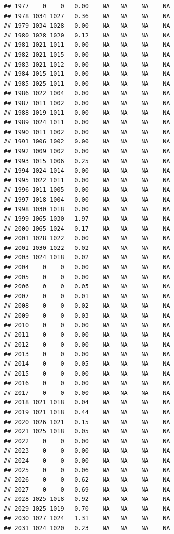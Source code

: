 \documentclass{article}\usepackage{graphicx, color}
\makeatletter
\newenvironment{kframe}{%
 \def\at@end@of@kframe{}%
 \ifinner\ifhmode%
  \def\at@end@of@kframe{\end{minipage}}%
  \begin{minipage}{\columnwidth}%
 \fi\fi%
 \def\FrameCommand##1{\hskip\@totalleftmargin \hskip-\fboxsep
 \colorbox{shadecolor}{##1}\hskip-\fboxsep
     \hskip-\linewidth \hskip-\@totalleftmargin \hskip\columnwidth}%
 \MakeFramed {\advance\hsize-\width
   \@totalleftmargin\z@ \linewidth\hsize
   \@setminipage}}%
 {\par\unskip\endMakeFramed%
 \at@end@of@kframe}
\newenvironment{knitrout}{}{} %
\makeatother
\begin{document}
\begin{knitrout}
\begin{kframe}
\begin{verbatim}
## 1977    0    0   0.00    NA   NA    NA    NA
## 1978 1034 1027   0.36    NA   NA    NA    NA
## 1979 1034 1028   0.00    NA   NA    NA    NA
## 1980 1028 1020   0.12    NA   NA    NA    NA
## 1981 1021 1011   0.00    NA   NA    NA    NA
## 1982 1021 1015   0.00    NA   NA    NA    NA
## 1983 1021 1012   0.00    NA   NA    NA    NA
## 1984 1015 1011   0.00    NA   NA    NA    NA
## 1985 1025 1011   0.00    NA   NA    NA    NA
## 1986 1022 1004   0.00    NA   NA    NA    NA
## 1987 1011 1002   0.00    NA   NA    NA    NA
## 1988 1019 1011   0.00    NA   NA    NA    NA
## 1989 1024 1011   0.00    NA   NA    NA    NA
## 1990 1011 1002   0.00    NA   NA    NA    NA
## 1991 1006 1002   0.00    NA   NA    NA    NA
## 1992 1009 1002   0.00    NA   NA    NA    NA
## 1993 1015 1006   0.25    NA   NA    NA    NA
## 1994 1024 1014   0.00    NA   NA    NA    NA
## 1995 1022 1011   0.00    NA   NA    NA    NA
## 1996 1011 1005   0.00    NA   NA    NA    NA
## 1997 1018 1004   0.00    NA   NA    NA    NA
## 1998 1030 1018   0.00    NA   NA    NA    NA
## 1999 1065 1030   1.97    NA   NA    NA    NA
## 2000 1065 1024   0.17    NA   NA    NA    NA
## 2001 1028 1022   0.00    NA   NA    NA    NA
## 2002 1030 1022   0.02    NA   NA    NA    NA
## 2003 1024 1018   0.02    NA   NA    NA    NA
## 2004    0    0   0.00    NA   NA    NA    NA
## 2005    0    0   0.00    NA   NA    NA    NA
## 2006    0    0   0.05    NA   NA    NA    NA
## 2007    0    0   0.01    NA   NA    NA    NA
## 2008    0    0   0.02    NA   NA    NA    NA
## 2009    0    0   0.03    NA   NA    NA    NA
## 2010    0    0   0.00    NA   NA    NA    NA
## 2011    0    0   0.00    NA   NA    NA    NA
## 2012    0    0   0.00    NA   NA    NA    NA
## 2013    0    0   0.00    NA   NA    NA    NA
## 2014    0    0   0.05    NA   NA    NA    NA
## 2015    0    0   0.00    NA   NA    NA    NA
## 2016    0    0   0.00    NA   NA    NA    NA
## 2017    0    0   0.00    NA   NA    NA    NA
## 2018 1021 1018   0.04    NA   NA    NA    NA
## 2019 1021 1018   0.44    NA   NA    NA    NA
## 2020 1026 1021   0.15    NA   NA    NA    NA
## 2021 1025 1018   0.05    NA   NA    NA    NA
## 2022    0    0   0.00    NA   NA    NA    NA
## 2023    0    0   0.00    NA   NA    NA    NA
## 2024    0    0   0.00    NA   NA    NA    NA
## 2025    0    0   0.06    NA   NA    NA    NA
## 2026    0    0   0.62    NA   NA    NA    NA
## 2027    0    0   0.69    NA   NA    NA    NA
## 2028 1025 1018   0.92    NA   NA    NA    NA
## 2029 1025 1019   0.70    NA   NA    NA    NA
## 2030 1027 1024   1.31    NA   NA    NA    NA
## 2031 1024 1020   0.23    NA   NA    NA    NA

\end{verbatim}
\end{kframe}
\end{knitrout}
\end{document}
